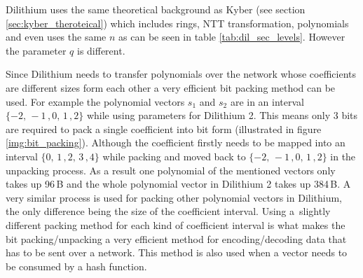 Dilithium uses the same theoretical background as Kyber (see section \ref{sec:kyber_theroteical}) which includes rings, NTT transformation, polynomials and even uses the same $n$ as can be seen in table \ref{tab:dil_sec_levels}. However the parameter $q$ is different.


Since Dilithium needs to transfer polynomials over the network whose coefficients are different sizes form each other a very efficient bit packing method can be used. For example the polynomial vectors $s_1$ and $s_2$ are in an interval $\{-2,\,-1\,,0,\,1\,,2\}$ while using parameters for Dilithium 2. This means only 3 bits are required to pack a single coefficient into bit form (illustrated in figure \ref{img:bit_packing}). Although the coefficient firstly needs to be mapped into an interval $\{0,\,1\,,2,\,3\,,4\}$ while packing and moved back to $\{-2,\,-1\,,0,\,1\,,2\}$ in the unpacking process. As a result one polynomial of the mentioned vectors only takes up 96\,B and the whole polynomial vector in Dilithium 2 takes up 384\,B. A very similar process is used for packing other polynomial vectors in Dilithium, the only difference being the size of the coefficient interval. Using a~slightly different packing method for each kind of coefficient interval is what makes the bit packing/unpacking a very efficient method for encoding/decoding data that has to be sent over a network. This method is also used when a vector needs to be consumed by a hash function.
